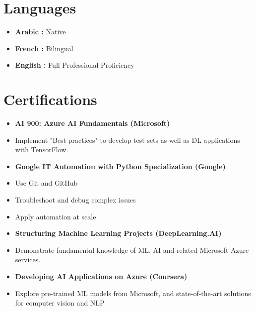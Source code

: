 \documentclass[letterpaper,11pt]{article}
\begin{document}
 \vspace{0.8pt}

\section{Languages}
\begin{multicols}{3}
    \begin{itemize}[itemsep=0pt, parsep=0pt, left=0pt, label={}]
        \item\small\columnbreak \textbf{Arabic :} Native
        \item\small\columnbreak \textbf{French :} Bilingual
        \item\small\columnbreak \textbf{English :} Full Professional Proficiency
            \end{itemize}
\end{multicols}

 \vspace{-0.8pt}


\iffalse

\section{Certifications}
\begin{multicols}{4}
    \begin{itemize}[itemsep=0pt, parsep=0pt, left=0pt, label={}]
        \item\small\columnbreak \textbf{AI 900: Azure AI Fundamentals (Microsoft)}
            \item Implement "Best practices" to develop test sets as well as DL applications with TensorFlow.
        
        \item\small\columnbreak \textbf{Google IT Automation with Python Specialization (Google)}
            \item Use Git and GitHub
            \item Troubleshoot and debug complex issues
            \item Apply automation at scale
        
        \item\small\columnbreak \textbf{Structuring Machine Learning Projects (DeepLearning.AI)}
            \item Demonstrate fundamental knowledge of ML, AI and related Microsoft Azure services.
        
        \item\small\columnbreak \textbf{Developing AI Applications on Azure (Coursera)}
            \item Explore pre-trained ML models from Microsoft, and state-of-the-art solutions for computer vision and NLP
    \end{itemize}
\end{multicols}
\end{document}
